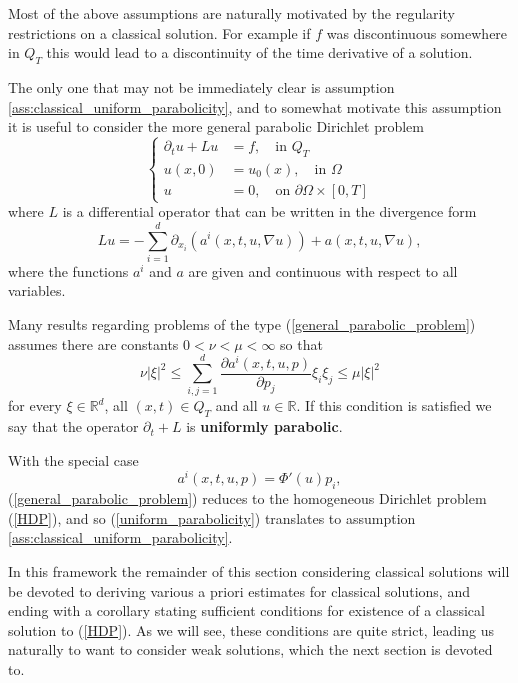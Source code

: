 \documentclass[11pt, a4paper]{article}
\begin{document}
Most of the above assumptions are naturally motivated by the regularity restrictions on a classical solution. For example if $f$ was discontinuous somewhere in $Q_T$ this would lead to a discontinuity of the time derivative of a solution.

The only one that may not be immediately clear is assumption \ref{ass:classical_uniform_parabolicity}, and to somewhat motivate this assumption it is useful to consider the more general parabolic Dirichlet problem 
\begin{equation}
\label{general_parabolic_problem}
	\begin{cases}
		\partial_t u + Lu &= f, \quad \text{in } Q_T \\
		u(x,0) &= u_0(x), \quad \text{in } \Omega \\
		u &= 0, \quad \text{on } \partial \Omega \times [0,T]
	\end{cases}
\end{equation}
where $L$ is a differential operator that can be written in the divergence form
\begin{equation}
\label{divergence_operator}
Lu = -\sum_{i=1}^d \partial_{x_i}(a^i(x,t,u,\nabla u)) + a(x,t,u,\nabla u),
\end{equation}
where the functions $a^i$ and $a$ are given and continuous with respect to all variables.

Many results regarding problems of the type (\ref{general_parabolic_problem}) assumes there are constants $0 < \nu < \mu < \infty $ so that
\begin{equation}
\label{uniform_parabolicity}
\nu |\xi|^2 \leq \sum_{i,j=1}^d \frac{\partial a^i(x,t,u,p)}{\partial p_j}\xi_i \xi_j \leq \mu |\xi|^2 
\end{equation}
for every $\xi \in \mathbb{R}^d$, all $(x,t) \in Q_T$ and all $u\in \mathbb{R}$. If this condition is satisfied we say that the operator $\partial_t + L$ is \textbf{uniformly parabolic}.

With the special case
\begin{equation*}
a^i(x,t,u,p) = \Phi'(u)p_i,
\end{equation*}
(\ref{general_parabolic_problem}) reduces to the homogeneous Dirichlet problem (\ref{HDP}),
and so (\ref{uniform_parabolicity}) translates to assumption \ref{ass:classical_uniform_parabolicity}.

In this framework the remainder of this section considering classical solutions will be devoted to deriving various a priori estimates for classical solutions, and ending with a corollary stating sufficient conditions for existence of a classical solution to (\ref{HDP}). As we will see, these conditions are quite strict, leading us naturally to want to consider weak solutions, which the next section is devoted to.
\end{document}
